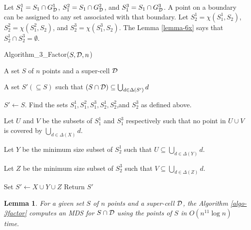 \documentclass[a4paper,11pt]{article}
\newtheorem{lemma}{Lemma}
\begin{document}
Let $S_1^1 =  S_1 \cap G_{\cal D}^1$, $S_1^2 =  S_1 \cap G_{\cal D}^2$, and $S_1^3 =  S_1 \cap G_{\cal D}^3$. 
A point on a boundary can be assigned to any set associated with that boundary. Let $S_2^1 = \chi(S_1^1, S_2)$, 
$S_2^2 = \chi(S_1^2, S_2)$, and $S_2^3 = \chi(S_1^3, S_2)$. The Lemma \ref{lemma-6x} says that 
$S_2^1 \cap S_2^3 = \emptyset$. 


\begin{algorithm}
\caption{Algorithm\_3\_Factor($S, {\cal D}, n$)}
\begin{algorithmic}[1]
 A set $S$ of $n$ points and a super-cell ${\cal D}$

 A set $S' (\subseteq S)$ such that $(S \cap {\cal D}) \subseteq \bigcup_{d \in \Delta(S')}d$

\STATE $S' \leftarrow S$.
\STATE Find the sets $S_1^1, S_1^2,S_1^3, S_2^1, S_2^2$,and $S_2^3$ as defined above.

	\STATE Let $U$ and $V$ be the subsets of $S_1^1$ and $S_1^3$ respectively such that no point in 
	$U \cup V$ is covered by $\bigcup_{d \in \Delta(X)}d$.
	
	\STATE Let $Y$ be the minimum size subset of $S_2^1$ such that $U \subseteq \bigcup_{d \in \Delta(Y)}d$.
	  
	\STATE Let $Z$ be the minimum size subset of $S_2^3$ such that $V \subseteq \bigcup_{d \in \Delta(Z)}d$.
	
	    \STATE Set $S' \leftarrow X \cup Y \cup Z$
	\ENDIF
  \ENDIF
\ENDFOR
\STATE Return $S'$
\end{algorithmic}
\label{algo-3factor}
\end{algorithm}


\begin{lemma} \label{lemma-7x}
For a given set $S$ of $n$ points and a super-cell ${\cal D}$, the Algorithm \ref{algo-3factor} computes an 
MDS for $S \cap {\cal D}$ using the points of $S$ in $O(n^{11} \log n)$ time.
\end{lemma}
\end{document}
